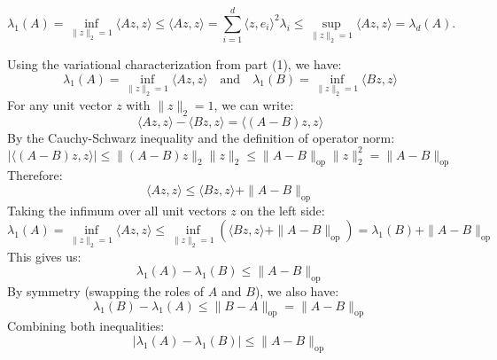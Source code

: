\begin{answer}
\begin{answerenum}
            \[
            \lambda_1(A) = \inf_{\|z\|_2=1} \langle Az, z \rangle \leq \langle Az, z \rangle = \sum_{i=1}^d \langle z, e_i \rangle^2 \lambda_i \leq \sup_{\|z\|_2=1} \langle Az, z \rangle = \lambda_{d}(A).
            \]
        \item Using the variational characterization from part (1), we have:
            \[
            \lambda_1(A) = \inf_{\|z\|_2=1} \langle Az, z \rangle \quad \text{and} \quad \lambda_1(B) = \inf_{\|z\|_2=1} \langle Bz, z \rangle
            \]
            For any unit vector \(z\) with \(\|z\|_2 = 1\), we can write:
            \[
            \langle Az, z \rangle - \langle Bz, z \rangle = \langle (A-B)z, z \rangle
            \]
            By the Cauchy-Schwarz inequality and the definition of operator norm:
            \[
            |\langle (A-B)z, z \rangle| \leq \|(A-B)z\|_2 \|z\|_2 \leq \|A-B\|_{\mathrm{op}} \|z\|_2^2 = \|A-B\|_{\mathrm{op}}
            \]
            Therefore:
            \[
            \langle Az, z \rangle \leq \langle Bz, z \rangle + \|A-B\|_{\mathrm{op}}
            \]
            Taking the infimum over all unit vectors \(z\) on the left side:
            \[
            \lambda_1(A) = \inf_{\|z\|_2=1} \langle Az, z \rangle \leq \inf_{\|z\|_2=1} (\langle Bz, z \rangle + \|A-B\|_{\mathrm{op}}) = \lambda_1(B) + \|A-B\|_{\mathrm{op}}
            \]
            This gives us:
            \[
            \lambda_1(A) - \lambda_1(B) \leq \|A-B\|_{\mathrm{op}}
            \]
            By symmetry (swapping the roles of \(A\) and \(B\)), we also have:
            \[
            \lambda_1(B) - \lambda_1(A) \leq \|B-A\|_{\mathrm{op}} = \|A-B\|_{\mathrm{op}}
            \]
            Combining both inequalities:
            \[
            |\lambda_1(A) - \lambda_1(B)| \leq \|A-B\|_{\mathrm{op}}
            \]
    \end{answerenum}
\end{answer}

